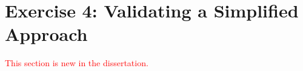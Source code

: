 \section{Exercise 4: Validating a Simplified Approach}

\textcolor{red}{This section is new in the dissertation.}